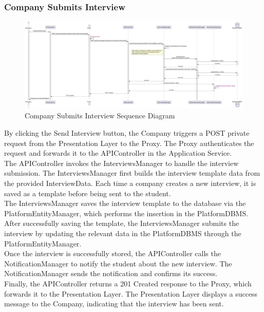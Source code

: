 \subsubsection*{Company Submits Interview}
\begin{figure}[H]
    \centering
    \includegraphics[width=\linewidth]{Latex/Images/DD/SequenceDiagrams/10CompanySubmitInterview.png}
    \caption{Company Submits Interview Sequence Diagram}
    \label{fig:compsubint}
\end{figure}
By clicking the Send Interview button, the Company triggers a POST private request from the Presentation Layer to the Proxy. The Proxy authenticates the request and forwards it to the APIController in the Application Service.\\
The APIController invokes the InterviewsManager to handle the interview submission. The InterviewsManager first builds the interview template data from the provided InterviewData. Each time a company creates a new interview, it is saved as a template before being sent to the student.\\
The InterviewsManager saves the interview template to the database via the PlatformEntityManager, which performs the insertion in the PlatformDBMS. After successfully saving the template, the InterviewsManager submits the interview by updating the relevant data in the PlatformDBMS through the PlatformEntityManager.\\
Once the interview is successfully stored, the APIController calls the NotificationManager to notify the student about the new interview. The NotificationManager sends the notification and confirms its success.\\
Finally, the APIController returns a 201 Created response to the Proxy, which forwards it to the Presentation Layer. The Presentation Layer displays a success message to the Company, indicating that the interview has been sent.

